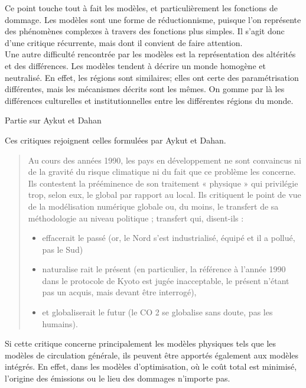 Ce point touche tout à fait les modèles, et particulièrement les fonctions de dommage. Les modèles sont une forme de réductionnisme, puisque l'on représente des phénomènes complexes à travers des fonctions plus simples. Il s'agit donc d'une critique récurrente, mais dont il convient de faire attention. \\


Une autre difficulté rencontrée par les modèles est la représentation des altérités et des différences. Les modèles tendent à décrire un monde homogène et neutralisé. En effet, les régions sont similaires; elles ont certe des paramétrisation différentes, mais les mécanismes décrits sont les mêmes. On gomme par là les différences culturelles et institutionnelles entre les différentes régions du monde. \\

\begin{tcolorbox}
    Partie sur Aykut et Dahan
\end{tcolorbox}

Ces critiques rejoignent celles formulées par Aykut et Dahan. 

\begin{quote}
    Au cours des années 1990, les pays en développement ne sont convaincus ni de la gravité du risque climatique ni du fait que ce problème les concerne. Ils contestent la prééminence de son traitement « physique » qui privilégie trop, selon eux, le global par rapport au local. Ils critiquent le point de vue de la modélisation numérique globale ou, du moins, le transfert de sa méthodologie au niveau politique ; transfert qui, disent-ils :  
    \begin{itemize}
        \item effacerait le passé (or, le Nord s’est industrialisé, équipé et il a pollué, pas le Sud)
	    \item naturalise rait le présent (en particulier, la référence à l’année 1990 dans le protocole de Kyoto est jugée inacceptable, le présent n’étant pas un acquis, mais devant être interrogé),
	   \item et globaliserait le futur (le CO 2 se globalise sans doute, pas les humains).
    \end{itemize}
\end{quote}

Si cette critique concerne principalement les modèles physiques tels que les modèles de circulation générale, ils peuvent être apportés également aux modèles intégrés. En effet, dans les modèles d'optimisation, où le coût total est minimisé, l'origine des émissions ou le lieu des dommages n'importe pas. 


